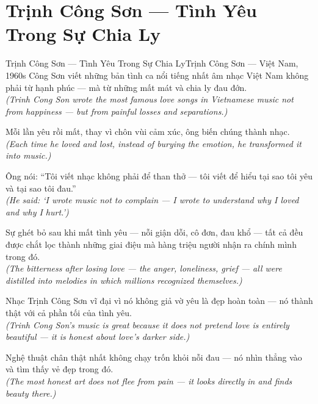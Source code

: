 \section{Trịnh Công Sơn --- Tình Yêu Trong Sự Chia Ly}
\begin{truyen}{Trịnh Công Sơn --- Tình Yêu Trong Sự Chia Ly}{Trịnh Công Sơn --- Việt Nam, 1960s}
 Công Sơn viết những bản tình ca nổi tiếng nhất âm nhạc Việt Nam không phải từ hạnh phúc --- mà từ những mất mát và chia ly đau đớn.\\[4pt]
\textit{(Trinh Cong Son wrote the most famous love songs in Vietnamese music not from happiness --- but from painful losses and separations.)}

Mỗi lần yêu rồi mất, thay vì chôn vùi cảm xúc, ông biến chúng thành nhạc.\\[4pt]
\textit{(Each time he loved and lost, instead of burying the emotion, he transformed it into music.)}

Ông nói: ``Tôi viết nhạc không phải để than thở --- tôi viết để hiểu tại sao tôi yêu và tại sao tôi đau.''\\[4pt]
\textit{(He said: `I wrote music not to complain --- I wrote to understand why I loved and why I hurt.')}

Sự ghét bỏ sau khi mất tình yêu --- nỗi giận dỗi, cô đơn, đau khổ --- tất cả đều được chắt lọc thành những giai điệu mà hàng triệu người nhận ra chính mình trong đó.\\[4pt]
\textit{(The bitterness after losing love --- the anger, loneliness, grief --- all were distilled into melodies in which millions recognized themselves.)}

Nhạc Trịnh Công Sơn vĩ đại vì nó không giả vờ yêu là đẹp hoàn toàn --- nó thành thật với cả phần tối của tình yêu.\\[4pt]
\textit{(Trinh Cong Son's music is great because it does not pretend love is entirely beautiful --- it is honest about love's darker side.)}

\end{truyen}
\begin{baihoc}
  Nghệ thuật chân thật nhất không chạy trốn khỏi nỗi đau --- nó nhìn thẳng vào và tìm thấy vẻ đẹp trong đó.\\[4pt]
  \textit{(The most honest art does not flee from pain --- it looks directly in and finds beauty there.)}
\end{baihoc}

